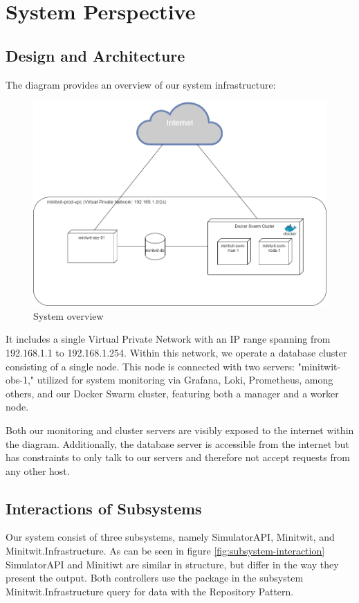 \section{System Perspective}

\subsection{Design and Architecture}
The diagram provides an overview of our system infrastructure:
\begin{figure}[H]
    \centering
    \includegraphics[width=0.7\linewidth]{images/system-overview.png}
    \caption{System overview}
    \label{fig:enter-label}
\end{figure}
It includes a single Virtual Private Network with an IP range spanning from 192.168.1.1 to 192.168.1.254. Within this network, we operate a database cluster consisting of a single node. This node is connected with two servers: "minitwit-obs-1," utilized for system monitoring via Grafana, Loki, Prometheus, among others, and our Docker Swarm cluster, featuring both a manager and a worker node.

Both our monitoring and cluster servers are visibly exposed to the internet within the diagram. Additionally, the database server is accessible from the internet but has constraints to only talk to our servers and therefore not accept requests from any other host.

\subsection{Interactions of Subsystems}
Our system consist of three subsystems, namely SimulatorAPI, Minitwit, and Minitwit.Infrastructure. As can be seen in figure \ref{fig:subsystem-interaction} SimulatorAPI and Minitiwt are similar in structure, but differ in the way they present the output. Both controllers use the package in the subsystem Minitwit.Infrastructure query for data with the Repository Pattern.


